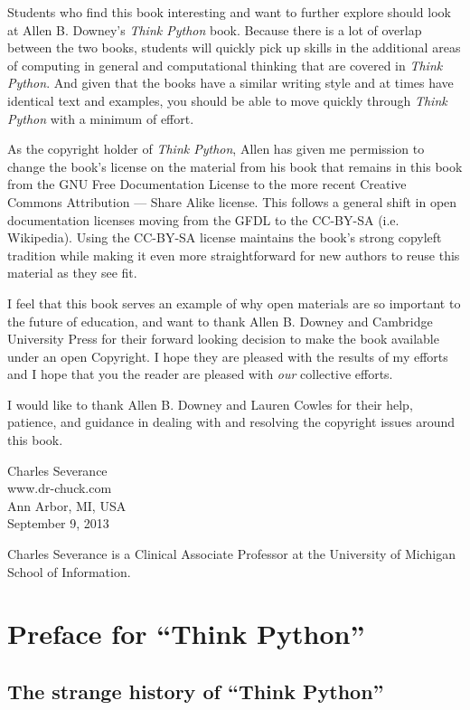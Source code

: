 \documentclass[11pt]{book}
\begin{document}
Students who find this book interesting and want to further explore
should look at Allen B. Downey's \emph{Think Python} book.  Because there
is a lot of overlap between the two books,
students will quickly pick up skills in the additional
areas of computing in general and computational thinking 
that are covered in \emph{Think Python}.
And given that the books have a similar writing style and at times
have identical text and examples, you should be 
able to move quickly through \emph{Think Python} with a minimum of effort.

As the copyright holder of \emph{Think Python},
Allen has given me permission to change the book's license 
on the material from his book that remains in this book
from the
GNU Free Documentation License 
to the more recent
Creative Commons Attribution --- Share Alike
license.
This follows a general shift in open documentation licenses moving 
from the GFDL to the CC-BY-SA (i.e. Wikipedia).
Using the CC-BY-SA license maintains the book's 
strong copyleft tradition while making it even more straightforward 
for new authors to reuse this material as they see fit.

I feel that this book serves an example of why open 
materials are so important to the future of education,
and want to thank Allen B. Downey and Cambridge University
Press for their forward looking decision to make the book available
under an open Copyright.   I hope they are pleased with the 
results of my efforts and I hope that you the reader are pleased with
\emph{our} collective efforts.

I would like to thank Allen B. Downey and Lauren Cowles for their help,
patience, and guidance in dealing with and resolving the copyright 
issues around this book.

Charles Severance\\
www.dr-chuck.com\\
Ann Arbor, MI, USA\\
September 9, 2013

Charles Severance is a 
Clinical Associate Professor 
at the University of Michigan School of Information.

\section*{Preface for ``Think Python''}

\subsection*{The strange history of ``Think Python''}
\end{document}
